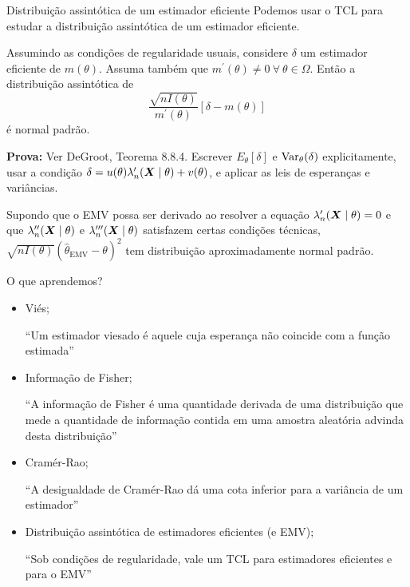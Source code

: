 \begin{frame}{Distribuição assintótica de um estimador eficiente}
Podemos usar o TCL para estudar a distribuição assintótica de um estimador eficiente.
\begin{theo}
\label{thm:asymptotic_distribution_efficient_estimator}
 Assumindo as condições de regularidade usuais, considere $\delta$ um estimador eficiente de $m(\theta)$.
 Assuma também que $m^\prime(\theta) \neq 0\: \forall\: \theta \in \Omega$.
 Então a distribuição assintótica de 
 \[\frac{\sqrt{nI(\theta)}}{m^\prime(\theta)} \left[ \delta - m(\theta) \right] \]
 é normal padrão. 
\end{theo}
\textbf{Prova:} Ver DeGroot, Teorema 8.8.4.
Escrever $E_\theta[\delta]$ e $\operatorname{Var}_\theta(\delta)$ explicitamente, usar a condição $\delta = u(\theta)\lambda_n^\prime(\boldsymbol{X} \mid \theta) + v(\theta)$, e aplicar as leis de esperanças e variâncias. 

\begin{obs}
\label{rmk:asymptotic_normality_MLE}
 Supondo que o EMV possa ser derivado ao resolver a equação $\lambda_n^\prime(\boldsymbol{X} \mid \theta) = 0$ e que $\lambda_n^{\prime\prime}(\boldsymbol{X} \mid \theta)$ e $\lambda_n^{\prime\prime\prime}(\boldsymbol{X} \mid \theta)$ satisfazem certas condições técnicas, $\sqrt{nI(\theta)} \left(\hat{\theta}_{\text{EMV}}-\theta\right)^2$ tem distribuição aproximadamente normal padrão.
\end{obs}
\end{frame}




\begin{frame}{O que aprendemos?}
\begin{itemize}
  \item[\faLightbulbO] Viés;
    
    ``Um estimador viesado é aquele cuja esperança não coincide com a função estimada''
    
   \item[\faLightbulbO] Informação de Fisher;
   
   ``A informação de Fisher é uma quantidade derivada de uma distribuição que mede a quantidade de informação contida em uma amostra aleatória advinda desta distribuição''
   
    \item[\faLightbulbO] Cramér-Rao;
    
    ``A desigualdade de Cramér-Rao dá uma cota inferior para a variância de um estimador''    
    
    \item[\faLightbulbO] Distribuição assintótica de estimadores eficientes (e EMV);
    
    ``Sob condições de regularidade, vale um TCL para estimadores eficientes e para o EMV''       
   
  \end{itemize}
 \end{frame}

